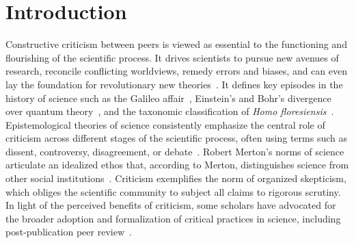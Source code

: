 \documentclass[12pt,a4paper]{article}
\numberwithin{equation}{section}
\begin{document}
    
\section*{Introduction}
Constructive criticism between peers is viewed as essential to the functioning and flourishing of the scientific process.
It drives scientists to pursue new avenues of research, reconcile conflicting worldviews, remedy errors and biases, and can even lay the foundation for revolutionary new theories~\cite{decruz_2013_value,bastian2014stronger}. 
It defines key episodes in the history of science such as the Galileo affair~\cite{feyerabend_1975_against}, Einstein’s and Bohr’s divergence over quantum theory~\cite{kumar_2010_quantum}, and the taxonomic classification of \textit{Homo floresiensis}~\cite{decruz_2013_value}.
Epistemological theories of science consistently emphasize the central role of criticism across different stages of the scientific process, often using terms such as dissent, controversy, disagreement, or debate~\cite{merton1942science, kitcher_advancement_1993,latour_science_1988,popper_logic_1959}.
Robert Merton's norms of science articulate an idealized ethos that, according to Merton, distinguishes science from other social institutions~\cite{merton1942science}.
Criticism exemplifies the norm of organized skepticism, which obliges the scientific community to subject all claims to rigorous scrutiny.
In light of the perceived benefits of criticism, some scholars have advocated for the broader adoption and formalization of critical practices in science, including post-publication peer review~\cite{bastian2014stronger,winker2015promise}.
\end{document}
